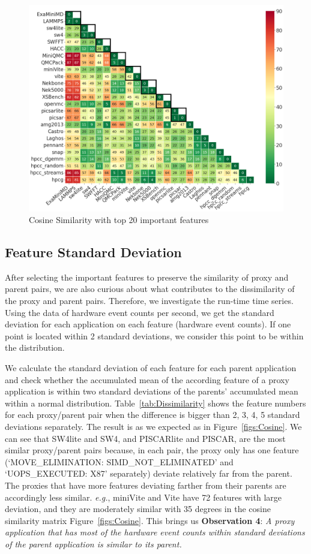 \documentclass[conference]{IEEEtran}
\newcommand{\eg}                {\emph{e.g.},\xspace}
\begin{document}
\begin{figure}[ht]
\centering
\includegraphics[width=\linewidth]{figs/top20cosine_origin_color_font20.png}
\caption{Cosine Similarity with top 20 important features}
\label{figs:top20Cosine}
\end{figure}

\subsection{Feature Standard Deviation}
\label{sec:Dev}
After selecting the important features to preserve the similarity of proxy and parent pairs, we are also curious about what contributes to the dissimilarity of the proxy and parent pairs. Therefore, we investigate the run-time time series. Using the data of hardware event counts per second, we get the standard deviation for each application on each feature (hardware event counts). If one point is located within 2 standard deviations, we consider this point to be within the distribution.


We calculate the standard deviation of each feature for each parent application and check whether the accumulated mean of the according feature of a proxy application is within two standard deviations of the parents' accumulated mean within a normal distribution. 
Table~\ref{tab:Dissimilarity} shows the feature numbers for each proxy/parent pair when the difference is bigger than 2, 3, 4, 5 standard deviations separately. The result is as we expected as in Figure~\ref{figs:Cosine}. We can see that SW4lite and SW4, and PISCARlite and PISCAR, are the most similar proxy/parent pairs because, in each pair, the proxy only has one feature (`MOVE\_ELIMINATION: SIMD\_NOT\_ELIMINATED' and `UOPS\_EXECUTED: X87' separately) deviate relatively far from the parent. The proxies that have more features deviating farther from their parents are accordingly less similar. \eg miniVite and Vite have 72 features with large deviation, and they are moderately similar with 35 degrees in the cosine similarity matrix Figure~\ref{figs:Cosine}. This 
brings us \textbf{Observation 4}: \textit{A proxy application that has most of the hardware event counts within standard deviations of the parent application is similar to its parent.} 
\end{document}
